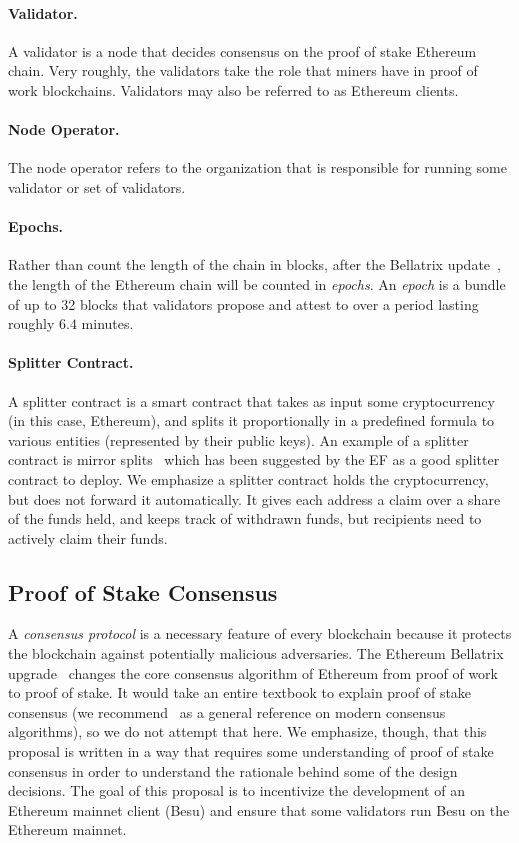 \paragraph{Validator.}  A validator is a node that decides consensus on the proof of stake Ethereum chain.  Very roughly, the validators take the role that miners have in proof of work blockchains.  Validators may also be referred to as Ethereum clients.

\paragraph{Node Operator.}  The node operator refers to the organization that is responsible for running some validator or set of validators.

\paragraph{Epochs.}  Rather than count the length of the chain in blocks, after the Bellatrix update~\cite{EthBella}, the length of the Ethereum chain will be counted in \emph{epochs}.  An \emph{epoch} is a bundle of up to 32 blocks that validators propose and attest to over a period lasting roughly $6.4$ minutes.

\paragraph{Splitter Contract.}  A splitter contract is a smart contract that takes as input some cryptocurrency (in this case, Ethereum), and splits it proportionally in a predefined formula to various entities (represented by their public keys).  An example of a splitter contract is mirror splits~\cite{Mirror} which has been suggested by the EF as a good splitter contract to deploy.  We emphasize a splitter contract holds the cryptocurrency, but does not forward it automatically. It gives each address a claim over a share of the funds held, and keeps track of withdrawn funds, but recipients need to actively claim their funds. 

\subsection{Proof of Stake Consensus}
A \emph{consensus protocol} is a necessary feature of every blockchain because it protects the blockchain against potentially malicious adversaries.  The Ethereum Bellatrix upgrade~\cite{EthBella} changes the core consensus algorithm of Ethereum from proof of work to proof of stake.  It would take an entire textbook to explain proof of stake consensus (we recommend~\cite{ShiBook} as a general reference on modern consensus algorithms), so we do not attempt that here.  We emphasize, though, that this proposal is written in a way that requires some understanding of proof of stake consensus in order to understand the rationale behind some of the design decisions.  The goal of this proposal is to incentivize the development of an Ethereum mainnet client (Besu) and ensure that some validators run Besu on the Ethereum mainnet.

